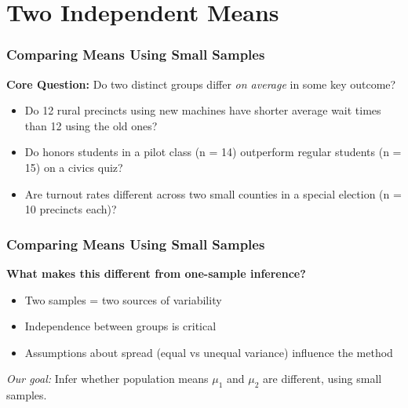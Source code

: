 \documentclass[handout]{beamer}
\begin{document}
\section{Two Independent Means}




\begin{frame}
\frametitle{Comparing Means Using Small Samples}

\textbf{Core Question:} Do two distinct groups differ \emph{on average} in some key outcome?

\vspace{1em}
\begin{itemize}
  \item Do 12 rural precincts using new machines have shorter average wait times than 12 using the old ones?
  \item Do honors students in a pilot class (n = 14) outperform regular students (n = 15) on a civics quiz?
  \item Are turnout rates different across two small counties in a special election (n = 10 precincts each)?
\end{itemize}
\end{frame}

\begin{frame}
\frametitle{Comparing Means Using Small Samples}

\textbf{What makes this different from one-sample inference?}
\begin{itemize}
  \item Two samples = two sources of variability  
  \item Independence between groups is critical  
  \item Assumptions about spread (equal vs unequal variance) influence the method
\end{itemize}

\vspace{1em}
\pause
\textit{Our goal:} Infer whether population means \(\mu_1\) and \(\mu_2\) are different, using small samples.
\end{frame}
\end{document}
